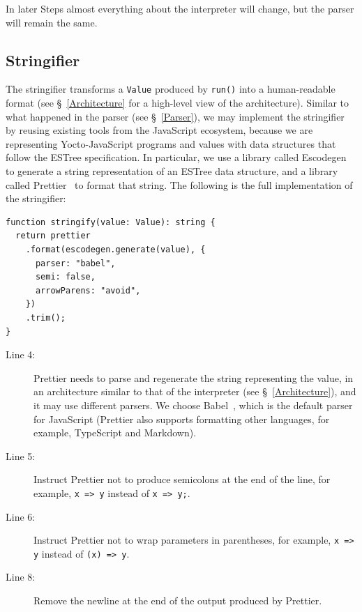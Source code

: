 \documentclass[12pt, oneside]{book}
\begin{document}
In later Steps almost everything about the interpreter will change, but the parser will remain the same.

\subsection{Stringifier}
\label{Step 0: Stringifier}

The stringifier transforms a \texttt{Value} produced by \texttt{run()} into a human-readable format (see §~\ref{Architecture} for a high-level view of the architecture). Similar to what happened in the parser (see §~\ref{Parser}), we may implement the stringifier by reusing existing tools from the JavaScript ecosystem, because we are representing Yocto-JavaScript programs and values with data structures that follow the ESTree specification. In particular, we use a library called Escodegen~\cite{escodegen} to generate a string representation of an ESTree data structure, and a library called Prettier~\cite{prettier} to format that string. The following is the full implementation of the stringifier:

\begin{verbatim}
function stringify(value: Value): string {
  return prettier
    .format(escodegen.generate(value), {
      parser: "babel",
      semi: false,
      arrowParens: "avoid",
    })
    .trim();
}
\end{verbatim}

\begin{description}
\item [Line 4:]

Prettier needs to parse and regenerate the string representing the value, in an architecture similar to that of the interpreter (see §~\ref{Architecture}), and it may use different parsers. We choose Babel~\cite{babel}, which is the default parser for JavaScript (Prettier also supports formatting other languages, for example, TypeScript and Markdown).

\item [Line 5:]

Instruct Prettier not to produce semicolons at the end of the line, for example, \texttt{x => y} instead of \texttt{x => y;}.

\item [Line 6:]

Instruct Prettier not to wrap parameters in parentheses, for example, \texttt{x => y} instead of \texttt{(x) => y}.

\item [Line 8:]

Remove the newline at the end of the output produced by Prettier.
\end{description}
\end{document}
